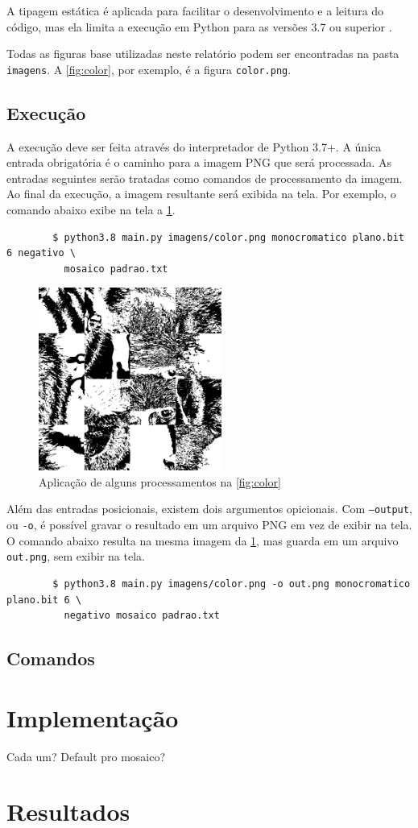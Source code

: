 \documentclass[assignment = 0]{homework}
\begin{document}
    A tipagem estática é aplicada para facilitar o desenvolvimento e a leitura do código, mas ela limita a execução em Python para as versões 3.7 ou superior \autocite{ref:pep563}.

    Todas as figuras base utilizadas neste relatório podem ser encontradas na pasta \texttt{imagens}. A \cref{fig:color}, por exemplo, é a figura \texttt{color.png}.

    \subsection{Execução}

    A execução deve ser feita através do interpretador de Python 3.7+. A única entrada obrigatória é o caminho para a imagem PNG que será processada. As entradas seguintes serão tratadas como comandos de processamento da imagem. Ao final da execução, a imagem resultante será exibida na tela. Por exemplo, o comando abaixo exibe na tela a \cref{fig:execucao}.

    \begin{verbatim}
        $ python3.8 main.py imagens/color.png monocromatico plano.bit 6 negativo \
          mosaico padrao.txt
    \end{verbatim}

    \begin{figure}[H]
        \centering
        \includegraphics[width=6cm]{resultados/execucao.png}

        \caption{Aplicação de alguns processamentos na \cref{fig:color}}
        \label{fig:execucao}
    \end{figure}

    Além das entradas posicionais, existem dois argumentos opicionais. Com \texttt{--output}, ou \texttt{-o}, é possível gravar o resultado em um arquivo PNG em vez de exibir na tela. O comando abaixo resulta na mesma imagem da \cref{fig:execucao}, mas guarda em um arquivo \texttt{out.png}, sem exibir na tela.

    \begin{verbatim}
        $ python3.8 main.py imagens/color.png -o out.png monocromatico plano.bit 6 \
          negativo mosaico padrao.txt
    \end{verbatim}

    \subsection{Comandos}

    \section{Implementação}
    Cada um? Default pro mosaico?

    \section{Resultados}
\end{document}
